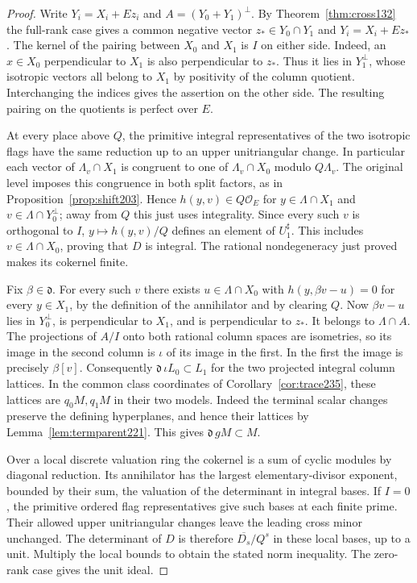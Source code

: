 \documentclass[a4paper,11pt]{article}
\theoremstyle{definition}
\theoremstyle{remark}
\numberwithin{equation}{section}
\begin{document}
\begin{proof}
Write \(Y_i=X_i+Ez_i\) and \(A=(Y_0+Y_1)^\perp\).
By Theorem~\ref{thm:cross132} the full-rank case gives a common
negative vector \(z_*\in Y_0\cap Y_1\) and
\(Y_i=X_i+Ez_*\). The kernel of the pairing between \(X_0\)
and \(X_1\) is \(I\) on either side. Indeed, an \(x\in X_0\)
perpendicular to \(X_1\) is also perpendicular to \(z_*\).
Thus it lies in \(Y_1^\perp\), whose isotropic vectors all
belong to \(X_1\) by positivity of the column quotient.
Interchanging the indices gives the assertion on the other
side. The resulting pairing on the quotients is perfect over
\(E\).

At every place above \(Q\), the primitive integral representatives
of the two isotropic flags have the same reduction up to an
upper unitriangular change. In particular each vector of
\(\Lambda_v\cap X_1\) is congruent to one of
\(\Lambda_v\cap X_0\) modulo \(Q\Lambda_v\). The original
level imposes this congruence in both split factors, as in
Proposition~\ref{prop:shift203}. Hence \(h(y,v)\in Q\mathcal O_E\)
for \(y\in\Lambda\cap X_1\) and \(v\in\Lambda\cap Y_0^\perp\);
away from \(Q\) this just uses integrality. Since every such
\(v\) is orthogonal to \(I\), \(y\mapsto h(y,v)/Q\) defines
an element of \(U_1^\sharp\). This includes \(v\in\Lambda\cap
X_0\), proving that \(D\) is integral. The rational
nondegeneracy just proved makes its cokernel finite.

Fix \(\beta\in\mathfrak d\). For every such \(v\) there exists
\(u\in\Lambda\cap X_0\) with \(h(y,\beta v-u)=0\) for every
\(y\in X_1\), by the definition of the annihilator and by
clearing \(Q\). Now \(\beta v-u\) lies in \(Y_0^\perp\), is
perpendicular to \(X_1\), and is perpendicular to \(z_*\).
It belongs to \(\Lambda\cap A\). The projections of \(A/I\)
onto both rational column spaces are isometries, so its image
in the second column is \(\iota\) of its image in the first.
In the first the image is precisely \(\beta[v]\).
Consequently \(\mathfrak d\,\iota L_0\subset L_1\) for the
two projected integral column lattices. In the common class
coordinates of Corollary~\ref{cor:trace235}, these lattices
are \(q_0M,q_1M\) in their two models. Indeed the terminal
scalar changes preserve the defining hyperplanes, and hence
their lattices by Lemma~\ref{lem:termparent221}.
This gives \(\mathfrak d\,gM\subset M\).

Over a local discrete valuation ring the cokernel is a sum of
cyclic modules by diagonal reduction. Its annihilator has the
largest elementary-divisor exponent, bounded by their sum, the
valuation of the determinant in integral bases. If \(I=0\),
the primitive ordered flag representatives give such bases at
each finite prime. Their allowed upper unitriangular changes
leave the leading cross minor unchanged. The determinant of
\(D\) is therefore \(\overline{D_s}/Q^s\) in these local bases,
up to a unit. Multiply the local bounds to obtain the stated
norm inequality. The zero-rank case gives the unit ideal.
\end{proof}
\end{document}
